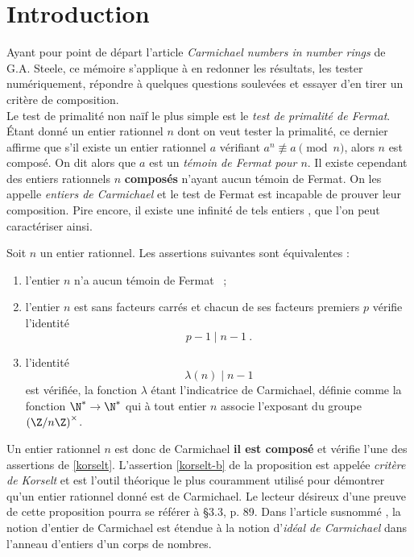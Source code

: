 \section*{Introduction}

Ayant pour point de départ l'article \textit{Carmichael numbers in number rings} \cite{article} de G.A. Steele, ce mémoire s'applique à en redonner les résultats, les tester numériquement, répondre à quelques questions soulevées et essayer d'en tirer un critère de composition. \\

Le test de primalité non naïf le plus simple est le \emph{test de primalité de Fermat}. Étant donné un entier rationnel $n$ dont on veut tester la primalité, ce dernier affirme que s'il existe un entier rationnel $a$ vérifiant $a^n \not \equiv a \pmod{n}$, alors $n$ est composé. On dit alors que $a$ est un \emph{témoin de Fermat pour $n$}. Il existe cependant des entiers rationnels $n$ \textbf{composés} n'ayant aucun témoin de Fermat. On les appelle \emph{entiers de Carmichael} et le test de Fermat est incapable de prouver leur composition. Pire encore, il existe une infinité de tels entiers , que l'on peut caractériser ainsi.

\begin{proposition}\label{korselt} Soit $n$ un entier rationnel. Les assertions suivantes sont équivalentes :
	\begin{enumerate}[font=\normalshape]
		\item l'entier $n$ n'a aucun témoin de Fermat ~;
		\item l'entier $n$ est sans facteurs carrés et chacun de ses facteurs premiers $p$ vérifie l'identité \[p-1 \mid n-1 ~.\] \label{korselt-b}
		\item l'identité \[\lambda(n) \mid n-1\] est vérifiée, la fonction $\lambda$ étant l'indicatrice de Carmichael, définie comme la fonction $\N^* \to \N^*$ qui à tout entier $n$ associe l'exposant du groupe $\left(\Z/n\Z\right)^\times$.
	\end{enumerate}
\end{proposition}

Un entier rationnel $n$ est donc de Carmichael \ssi \textbf{il est composé} et vérifie l'une des assertions de \ref{korselt}. L'assertion \ref{korselt-b} de la proposition est appelée \textit{critère de Korselt} et est l'outil théorique le plus couramment utilisé pour démontrer qu'un entier rationnel donné est de Carmichael. Le lecteur désireux d'une preuve de cette proposition pourra se référer à \cite{Demazure} §3.3, p. 89. Dans l'article susnommé \cite{article}, la notion d'entier de Carmichael est étendue à la notion d'\emph{idéal de Carmichael} dans l'anneau d'entiers d'un corps de nombres.

